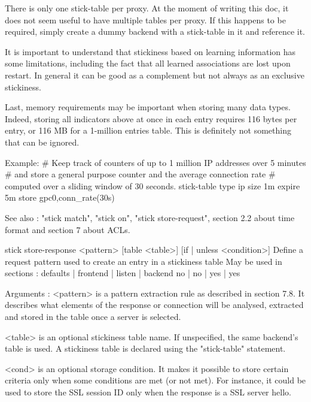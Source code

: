   There is only one stick-table per proxy. At the moment of writing this doc,
  it does not seem useful to have multiple tables per proxy. If this happens
  to be required, simply create a dummy backend with a stick-table in it and
  reference it.

  It is important to understand that stickiness based on learning information
  has some limitations, including the fact that all learned associations are
  lost upon restart. In general it can be good as a complement but not always
  as an exclusive stickiness.

  Last, memory requirements may be important when storing many data types.
  Indeed, storing all indicators above at once in each entry requires 116 bytes
  per entry, or 116 MB for a 1-million entries table. This is definitely not
  something that can be ignored.

  Example:
        # Keep track of counters of up to 1 million IP addresses over 5 minutes
        # and store a general purpose counter and the average connection rate
        # computed over a sliding window of 30 seconds.
        stick-table type ip size 1m expire 5m store gpc0,conn_rate(30s)

  See also : "stick match", "stick on", "stick store-request", section 2.2
             about time format and section 7 about ACLs.


stick store-response <pattern> [table <table>] [{if | unless} <condition>]
  Define a request pattern used to create an entry in a stickiness table
  May be used in sections :   defaults | frontend | listen | backend
                                 no    |    no    |   yes  |   yes

  Arguments :
    <pattern>  is a pattern extraction rule as described in section 7.8. It
               describes what elements of the response or connection will
               be analysed, extracted and stored in the table once a
               server is selected.

    <table>    is an optional stickiness table name. If unspecified, the same
               backend's table is used. A stickiness table is declared using
               the "stick-table" statement.

    <cond>     is an optional storage condition. It makes it possible to store
               certain criteria only when some conditions are met (or not met).
               For instance, it could be used to store the SSL session ID only
               when the response is a SSL server hello.

